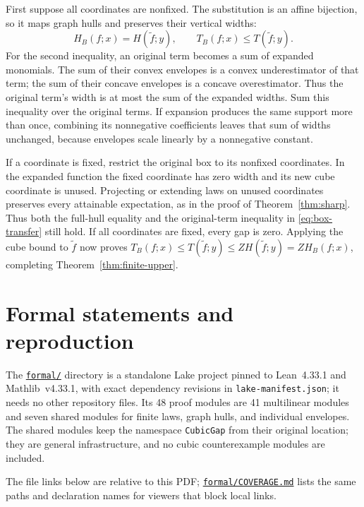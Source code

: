 \documentclass[11pt]{article}
\theoremstyle{remark}
\begin{document}
First suppose all coordinates are nonfixed. The substitution is an
affine bijection, so it maps graph hulls and preserves their vertical
widths:
\begin{equation}\label{eq:box-transfer}
 H_B(f;x)=H(\widetilde f;y),\qquad
 T_B(f;x)\le T(\widetilde f;y).
\end{equation}
For the second inequality, an original term becomes a sum of expanded
monomials. The sum of their convex envelopes is a convex underestimator
of that term; the sum of their concave envelopes is a concave
overestimator. Thus the original term's width is at most the sum of
the expanded widths. Sum this inequality over the original terms.
If expansion produces the same support more than once, combining its
nonnegative coefficients leaves that sum of widths unchanged, because
envelopes scale linearly by a nonnegative constant.

If a coordinate is fixed, restrict the original box to its nonfixed
coordinates. In the expanded function the fixed coordinate has zero
width and its new cube coordinate is unused. Projecting or extending
laws on unused coordinates preserves every attainable expectation, as
in the proof of Theorem~\ref{thm:sharp}. Thus both the full-hull equality
and the original-term inequality in \eqref{eq:box-transfer} still hold.
If all coordinates are fixed, every gap is zero. Applying the cube
bound to $\widetilde f$ now proves
$T_B(f;x)\le T(\widetilde f;y)\le ZH(\widetilde f;y)=ZH_B(f;x)$,
completing Theorem~\ref{thm:finite-upper}.

\section{Formal statements and reproduction}\label{app:lean}
The \href{formal/README.md}{\texttt{formal/}} directory is a standalone
Lake project pinned to Lean~4.33.1 and Mathlib~v4.33.1, with exact
dependency revisions in \texttt{lake-manifest.json}; it needs no other
repository files. Its 48 proof modules are 41 multilinear modules and seven shared
modules for finite laws, graph hulls, and individual envelopes. The
shared modules keep the namespace \texttt{CubicGap} from their original
location; they are general infrastructure, and no cubic counterexample
modules are included.

The file links below are relative to this PDF;
\href{formal/COVERAGE.md}{\texttt{formal/COVERAGE.md}} lists the same
paths and declaration names for viewers that block local links.
\end{document}
